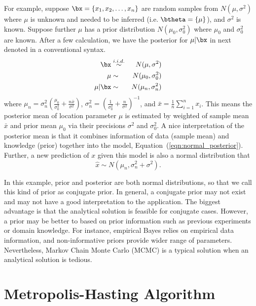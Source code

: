 For example, suppose $\bx = \{x_1, x_2, \ldots, x_n\}$ are random samples from
$N(\mu, \sigma^2)$ where $\mu$ is unknown and needed to be inferred
(i.e. $\btheta = \{\mu\}$), and
$\sigma^2$ is known. Suppose further $\mu$ has a prior distribution
$N(\mu_0, \sigma_0^2)$ where $\mu_0$ and $\sigma_0^2$ are known.
After a few calculation, we have the posterior for $\mu | \bx$ in next
denoted in a conventional syntax.
\begin{eqnarray}
\bx
  & \stackrel{i.i.d.}{\sim} & N(\mu, \sigma^2) \nonumber \\
\mu
  & \sim & N(\mu_0, \sigma_0^2) \nonumber \\
\mu|\bx
  & \sim & N(\mu_n, \sigma_n^2) \label{eqn:normal_posterior}
\end{eqnarray}
where
$\mu_n = \sigma_n^2
       \left(\frac{\mu_0}{\sigma_0^2} + \frac{n\bar{x}}{\sigma^2} \right)$,
$\sigma_n^2
 = \left(\frac{1}{\sigma_0^2} + \frac{n}{\sigma^2} \right)^{-1}$,
and $\bar{x} = \frac{1}{n} \sum_{i = 1}^n x_i$.
This means the posterior mean of location parameter $\mu$ is estimated by
weighted of sample mean $\bar{x}$ and prior mean $\mu_0$ via their precisions
$\sigma^2$ and $\sigma_0^2$. A nice interpretation of the posterior mean is
that it combines information of data (sample mean) and knowledge (prior)
together into the model, Equation~(\ref{eqn:normal_posterior}).
Further, a new prediction of $x$ given this model is also a normal
distribution that
\begin{equation}
\hat{x} \sim N(\mu_n, \sigma_n^2 + \sigma^2).
\label{eqn:normal_prediction}
\end{equation}

In this example, prior and posterior are both normal distributions, so that we
call this kind of prior as conjugate prior.
In general, a conjugate prior may
not exist and may not have a good interpretation to the application.
The biggest advantage is that the analytical solution is feasible for conjugate
cases. However, a prior may be better to based on prior information such as
previous experiments or domain knowledge. For instance, empirical Bayes
relies on empirical data information, and non-informative priors provide
wider range of parameters. Nevertheless,
Markov Chain Monte Carlo (MCMC)
is a typical solution when an analytical solution is tedious.


\section{Metropolis-Hasting Algorithm}

